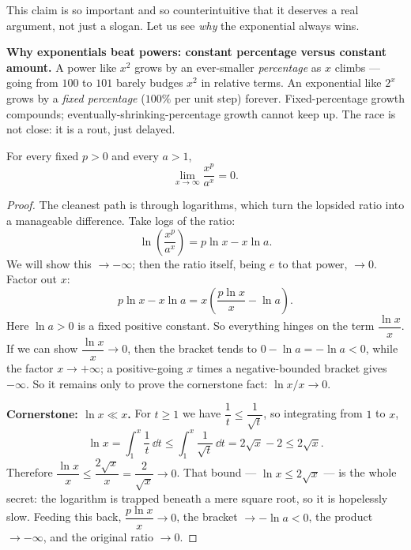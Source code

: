 This claim is so important and so counterintuitive that it deserves a real
argument, not just a slogan. Let us see \emph{why} the exponential always wins.

\begin{intuitionbox}
\textbf{Why exponentials beat powers: constant percentage versus constant
amount.} A power like $x^2$ grows by an ever-smaller \emph{percentage} as $x$
climbs --- going from $100$ to $101$ barely budges $x^2$ in relative terms. An
exponential like $2^x$ grows by a \emph{fixed percentage} ($100\%$ per unit
step) forever. Fixed-percentage growth compounds; eventually-shrinking-percentage
growth cannot keep up. The race is not close: it is a rout, just delayed.
\end{intuitionbox}

\begin{theorem}
\label{ch09:thm-exp-beats-power}
For every fixed $p>0$ and every $a>1$,
\[
   \lim_{x\to\infty} \frac{x^{p}}{a^{x}} = 0 .
\]
\end{theorem}

\begin{proof}
The cleanest path is through logarithms, which turn the lopsided ratio into a
manageable difference. Take logs of the ratio:
\[
  \ln\!\left(\frac{x^{p}}{a^{x}}\right)
  = p\ln x - x\ln a .
\]
We will show this $\to -\infty$; then the ratio itself, being $e$ to that power,
$\to 0$. Factor out $x$:
\[
  p\ln x - x\ln a = x\left( \frac{p\ln x}{x} - \ln a\right).
\]
Here $\ln a > 0$ is a fixed positive constant. So everything hinges on the term
$\dfrac{\ln x}{x}$. If we can show $\dfrac{\ln x}{x}\to 0$, then the bracket
tends to $0-\ln a = -\ln a < 0$, while the factor $x\to+\infty$; a positive-going
$x$ times a negative-bounded bracket gives $-\infty$. So it remains only to
prove the cornerstone fact: $\ln x / x \to 0$.

\textbf{Cornerstone: $\ln x \ll x$.} For $t\ge 1$ we have $\dfrac{1}{t}\le
\dfrac{1}{\sqrt t}$, so integrating from $1$ to $x$,
\[
  \ln x = \int_1^x \frac{1}{t}\,\dd t \le \int_1^x \frac{1}{\sqrt t}\,\dd t
  = 2\sqrt x - 2 \le 2\sqrt x .
\]
Therefore $\dfrac{\ln x}{x} \le \dfrac{2\sqrt x}{x} = \dfrac{2}{\sqrt x}\to 0$.
That bound --- $\ln x \le 2\sqrt x$ --- is the whole secret: the logarithm is
trapped beneath a mere square root, so it is hopelessly slow. Feeding this back,
$\dfrac{p\ln x}{x}\to 0$, the bracket $\to -\ln a<0$, the product $\to -\infty$,
and the original ratio $\to 0$.
\end{proof}

